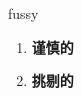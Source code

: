 
\begin{frame}
{\huge fussy}
\begin{center}
\begin{enumerate}\Large
  \item \textbf{谨慎的}
  \item \textbf{挑剔的}
\end{enumerate}
\end{center}
\end{frame}
